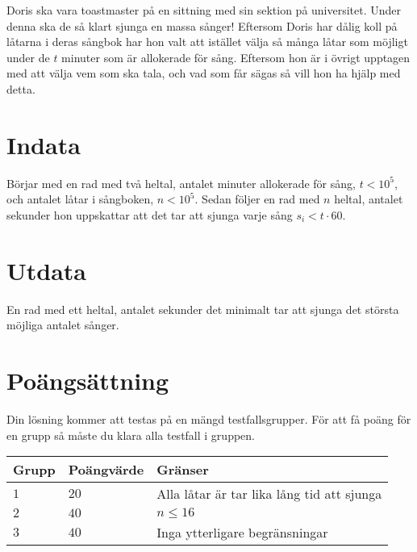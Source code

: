 \noindent
Doris ska vara toastmaster på en sittning med sin sektion på universitet. Under denna ska de så klart sjunga en massa sånger! 
Eftersom Doris har dålig koll på låtarna i deras sångbok har hon valt att istället välja så många låtar som möjligt under de $t$ minuter som är allokerade för sång. 
Eftersom hon är i övrigt upptagen med att välja vem som ska tala, och vad som får sägas så vill hon ha hjälp med detta.
\section*{Indata}
\noindent
Börjar med en rad med två heltal, antalet minuter allokerade för sång, $t < 10^5$, och antalet låtar i sångboken, $n< 10^5$. Sedan följer en rad med $n$ heltal, antalet sekunder hon uppskattar att det tar att sjunga varje sång $s_i < t \cdot 60$.
\section*{Utdata}
\noindent
En rad med ett heltal, antalet sekunder det minimalt tar att sjunga det största möjliga antalet sånger.
\section*{Poängsättning}
\noindent
Din lösning kommer att testas på en mängd testfallsgrupper.
För att få poäng för en grupp så måste du klara alla testfall i gruppen.

\noindent
\begin{tabular}{| l | l | l |}
\hline
  Grupp & Poängvärde & Gränser \\ \hline
  $1$    & $20$       &  Alla låtar är tar lika lång tid att sjunga \\ \hline 
  $2$    & $40$       &  $n \leq 16$ \\ \hline
  $3$    & $40$       &  Inga ytterligare begränsningar \\ \hline
\end{tabular}
